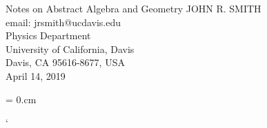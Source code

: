 \documentclass[epsf]{article}
\begin{document}

\begin{center}{{\twelvebf Notes on Abstract Algebra and Geometry}}
\vglue 1.0cm
{\tenrm JOHN R.\,\,SMITH\\}
{email: jrsmith@ucdavis.edu\\}
\vglue 0.25cm
\baselineskip=13pt
{\tenit Physics Department\\
University of California, Davis\\}
\baselineskip=12pt
{\tenit Davis, CA 95616-8677, USA\\}
\vglue 0.5cm
{\rm April 14, 2019 \\}
\end{center}


%


\parindent = 0.cm
\twelverm
\baselineskip=14pt
\noindent

%
%

%
`






















%
\clearpage
\end{document}
